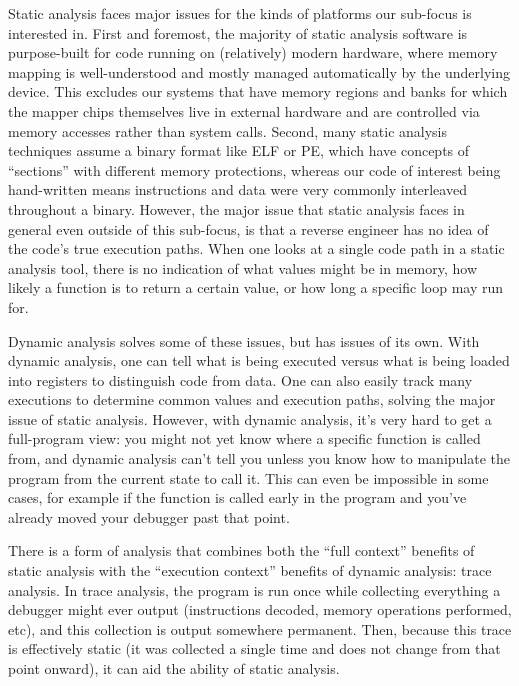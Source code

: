 \documentclass[manuscript,anonymous,review,authorversion=true,nonacm=true,screen]{acmart}
\begin{document}
Static analysis faces major issues for the kinds of platforms our sub-focus is interested in.
First and foremost, the majority of static analysis software is purpose-built for code running on (relatively) modern hardware, where memory mapping is well-understood and mostly managed automatically by the underlying device.
This excludes our systems that have memory regions and banks for which the mapper chips themselves live in external hardware and are controlled via memory accesses rather than system calls.
Second, many static analysis techniques assume a binary format like ELF or PE, which have concepts of ``sections'' with different memory protections, whereas our code of interest being hand-written means instructions and data were very commonly interleaved throughout a binary.
However, the major issue that static analysis faces in general even outside of this sub-focus, is that a reverse engineer has no idea of the code's true execution paths.
When one looks at a single code path in a static analysis tool, there is no indication of what values might be in memory, how likely a function is to return a certain value, or how long a specific loop may run for.

Dynamic analysis solves some of these issues, but has issues of its own.
With dynamic analysis, one can tell what is being executed versus what is being loaded into registers to distinguish code from data.
One can also easily track many executions to determine common values and execution paths, solving the major issue of static analysis.
However, with dynamic analysis, it's very hard to get a full-program view: you might not yet know where a specific function is called from, and dynamic analysis can't tell you unless you know how to manipulate the program from the current state to call it.
This can even be impossible in some cases, for example if the function is called early in the program and you've already moved your debugger past that point.

There is a form of analysis that combines both the ``full context'' benefits of static analysis with the ``execution context'' benefits of dynamic analysis: trace analysis.
In trace analysis, the program is run once while collecting everything a debugger might ever output (instructions decoded, memory operations performed, etc), and this collection is output somewhere permanent.
Then, because this trace is effectively static (it was collected a single time and does not change from that point onward), it can aid the ability of static analysis.
\end{document}
